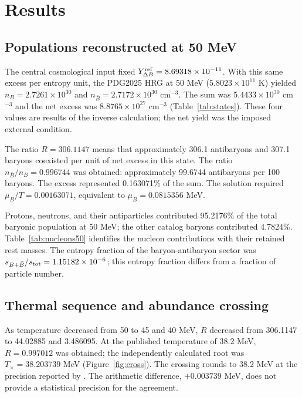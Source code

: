 \section{Results}
\subsection{Populations reconstructed at 50 MeV}
The central cosmological input fixed $Y_{\Delta B}^{\rm ref}=8.69318\times10^{-11}$. With this same excess per entropy unit, the PDG2025 HRG at 50 MeV ($5.8023\times10^{11}$ K) yielded $n_B=2.7261\times10^{30}$ and $n_{\bar B}=2.7172\times10^{30}$ cm$^{-3}$. The sum was $5.4433\times10^{30}$ cm$^{-3}$ and the net excess was $8.8765\times10^{27}$ cm$^{-3}$ (Table~\ref{tab:states}). These four values are results of the inverse calculation; the net yield was the imposed external condition.

The ratio $R=306.1147$ means that approximately 306.1 antibaryons and 307.1 baryons coexisted per unit of net excess in this state. The ratio $n_{\bar B}/n_B=0.996744$ was obtained: approximately 99.6744 antibaryons per 100 baryons. The excess represented 0.163071\% of the sum. The solution required $\mu_B/T=0.00163071$, equivalent to $\mu_B=0.0815356$ MeV.



Protons, neutrons, and their antiparticles contributed 95.2176\% of the total baryonic population at 50 MeV; the other catalog baryons contributed 4.7824\%. Table~\ref{tab:nucleons50} identifies the nucleon contributions with their retained rest masses. The entropy fraction of the baryon-antibaryon sector was $s_{B+\bar B}/s_{\rm tot}=1.15182\times10^{-6}$; this entropy fraction differs from a fraction of particle number.



\subsection{Thermal sequence and abundance crossing}
As temperature decreased from 50 to 45 and 40 MeV, $R$ decreased from 306.1147 to 44.02885 and 3.486095. At the published temperature of 38.2 MeV, $R=0.997012$ was obtained; the independently calculated root was $T_\times=38.203739$ MeV (Figure~\ref{fig:cross}). The crossing rounds to 38.2 MeV at the precision reported by \citet{Yang2022}. The arithmetic difference, $+0.003739$ MeV, does not provide a statistical precision for the agreement.

